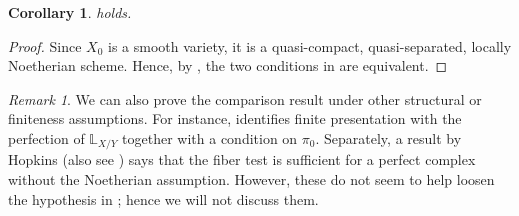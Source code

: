 \documentclass{article}
\numberwithin{equation}{section} %
\theoremstyle{plain}
\newtheorem{corollary}{Corollary}[theorem]
\theoremstyle{definition}
\theoremstyle{remark}
\newtheorem{remark}{Remark}
\begin{document}
\begin{corollary}
 holds.
\end{corollary}
\begin{proof}
Since $X_0$ is a smooth variety, it is a quasi-compact, quasi-separated, locally Noetherian scheme.
Hence, by , the two conditions in  are equivalent.
\end{proof}


\begin{remark}
We can also prove the comparison result under other structural or finiteness assumptions.
For instance, \cite[Proposition 3.2.18]{Lu04} identifies finite presentation with the perfection of $\mathbb{L}_{X/Y}$ together with a condition on $\pi_0$.
Separately, a result by Hopkins (also see \cite{N92}) says that the fiber test is sufficient for a perfect complex without the Noetherian assumption.
However, these do not seem to help loosen the hypothesis in ; hence we will not discuss them.
\end{remark}
\end{document}

